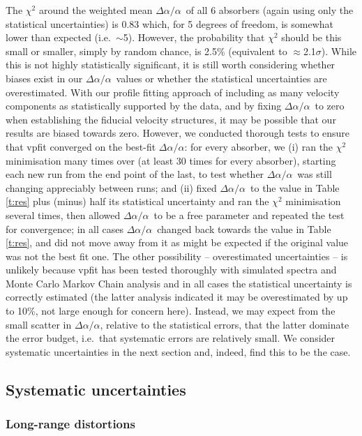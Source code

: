 \documentclass[fleqn,usenatbib,usedcolumn]{mnras}
\newcommand{\Tref}[1]{Table \ref{#1}}
\newcommand{\daa}{\ensuremath{\Delta\alpha/\alpha}}
\begin{document}
The $\chi^2$ around the weighted mean \daa\ of all 6 absorbers (again using only the statistical uncertainties) is 0.83 which, for 5 degrees of freedom, is somewhat lower than expected (i.e.\ $\sim$5). However, the probability that $\chi^2$ should be this small or smaller, simply by random chance, is 2.5\% (equivalent to $\approx$2.1$\sigma$). While this is not highly statistically significant, it is still worth considering whether biases exist in our \daa\ values or whether the statistical uncertainties are overestimated. With our profile fitting approach of including as many velocity components as statistically supported by the data, and by fixing \daa\ to zero when establishing the fiducial velocity structures, it may be possible that our results are biased towards zero. However, we conducted thorough tests to ensure that {\sc vpfit} converged on the best-fit \daa: for every absorber, we (i) ran the $\chi^2$ minimisation many times over (at least 30 times for every absorber), starting each new run from the end point of the last, to test whether \daa\ was still changing appreciably between runs; and (ii) fixed \daa\ to the value in \Tref{t:res} plus (minus) half its statistical uncertainty and ran the $\chi^2$ minimisation several times, then allowed \daa\ to be a free parameter and repeated the test for convergence; in all cases \daa\ changed back towards the value in \Tref{t:res}, and did not move away from it as might be expected if the original value was not the best fit one. The other possibility -- overestimated uncertainties -- is unlikely because {\sc vpfit} has been tested thoroughly with simulated spectra \citep[e.g.][]{Murphy:2003:thesis,Murphy:2008:1611} and Monte Carlo Markov Chain analysis \citep{King:2009:864} and in all cases the statistical uncertainty is correctly estimated (the latter analysis indicated it may be overestimated by up to 10\%, not large enough for concern here). Instead, we may expect from the small scatter in \daa, relative to the statistical errors, that the latter dominate the error budget, i.e.\ that systematic errors are relatively small. We consider systematic uncertainties in the next section and, indeed, find this to be the case.


\subsection{Systematic uncertainties}\label{ss:syserr}

\subsubsection{Long-range distortions}\label{sss:long}
\end{document}
